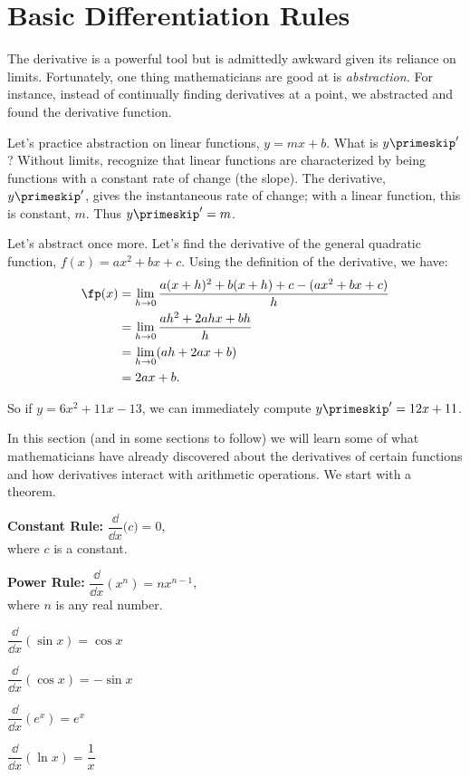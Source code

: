 \section{Basic Differentiation Rules}\label{sec:basic_diff_rules}

The derivative is a powerful tool but is admittedly awkward given its reliance on limits. Fortunately, one thing mathematicians are good at is \emph{abstraction.} For instance, instead of continually finding derivatives at a point, we abstracted and found the derivative function. 

Let's practice abstraction on linear functions, $y=mx+b$. What is $y\primeskip'$? Without limits, recognize that linear functions are characterized by being functions with a constant rate of change (the slope). The derivative, $y\primeskip'$, gives the instantaneous rate of change; with a linear function, this is constant, $m$. Thus $y\primeskip'=m$. 

Let's abstract once more. Let's find the derivative of the general quadratic function, $f(x) = ax^2+bx+c$. Using the definition of the derivative, we have:
\begin{align*}
	\fp(x)
	&=	\lim_{h\to 0}\frac{a(x+h)^2+b(x+h)+c-(ax^2+bx+c)}{h} \\
	&=	\lim_{h\to 0} \frac{ah^2+2ahx+bh}{h} \\
	&=	\lim_{h\to 0}(ah+2ax+b)\\
	&= 2ax+b.
\end{align*}
		
So if $y = 6x^2+11x-13$, we can immediately compute $y\primeskip' = 12x+11$.\bigskip

In this section (and in some sections to follow) we will learn some of what mathematicians have already discovered about the derivatives of certain functions and how derivatives interact with arithmetic operations. We start with a theorem.

\begin{theorem}\label{thm:deriv_common}%
\begin{enumext*}[columns=2]
\item \textbf{Constant Rule:} $\dfrac \dd{\dd x}\bigl( c\bigr) = 0$,\\
\null\quad where $c$ is a constant.
\item \textbf{Power Rule:} $\dfrac \dd{\dd x}\left(x^n\right) = nx^{n-1}$,\\
\null\quad where $n$ is any real number.
\item $\dfrac \dd{\dd x}(\sin x) = \cos x$
\item $\dfrac \dd{\dd x}(\cos x) = -\sin x$\smallskip
\item $\dfrac \dd{\dd x}\left(e^x\right) = e^x$
\item $\dfrac \dd{\dd x}(\ln x) = \dfrac1x$
\end{enumext*}
\end{theorem}

